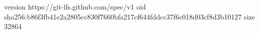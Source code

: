 version https://git-lfs.github.com/spec/v1
oid sha256:b86f3fb41e2a2805cc830f7660bfa217cf644fddcc37f6c018d03cf8d3b10127
size 32864
